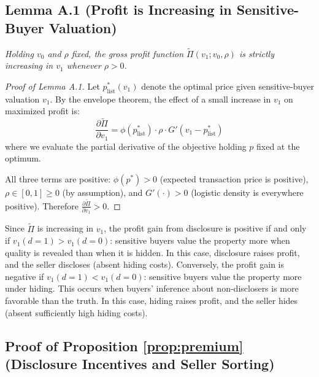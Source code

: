 \documentclass[10pt,letterpaper]{bp-template-concise}
\begin{document}
\subsection*{Lemma A.1 (Profit is Increasing in Sensitive-Buyer Valuation)}
\label{lem:profit}

\textit{Holding $v_0$ and $\rho$ fixed, the gross profit function $\tilde{\Pi}(v_1; v_0, \rho)$ is strictly increasing in $v_1$ whenever $\rho > 0$.}

\begin{proof}[Proof of Lemma A.1]
Let $p_{\mathrm{list}}^*(v_1)$ denote the optimal price given sensitive-buyer valuation $v_1$. By the envelope theorem, the effect of a small increase in $v_1$ on maximized profit is:
\begin{equation}
    \frac{\partial \tilde{\Pi}}{\partial v_1} = \phi(p_{\mathrm{list}}^*) \cdot \rho \cdot G'(v_1 - p_{\mathrm{list}}^*)
\end{equation}
where we evaluate the partial derivative of the objective holding $p$ fixed at the optimum.

All three terms are positive: $\phi(p^*) > 0$ (expected transaction price is positive), $\rho \in [0,1] \geq 0$ (by assumption), and $G'(\cdot) > 0$ (logistic density is everywhere positive). Therefore $\frac{\partial \tilde{\Pi}}{\partial v_1} > 0$.
\end{proof}

Since $\tilde{\Pi}$ is increasing in $v_1$, the profit gain from disclosure is positive if and only if $v_1(d=1) > v_1(d=0)$: sensitive buyers value the property more when quality is revealed than when it is hidden. In this case, disclosure raises profit, and the seller discloses (absent hiding costs). Conversely, the profit gain is negative if $v_1(d=1) < v_1(d=0)$: sensitive buyers value the property more under hiding. This occurs when buyers' inference about non-disclosers is more favorable than the truth. In this case, hiding raises profit, and the seller hides (absent sufficiently high hiding costs).

\subsection*{Proof of Proposition \ref{prop:premium} (Disclosure Incentives and Seller Sorting)}
\end{document}
